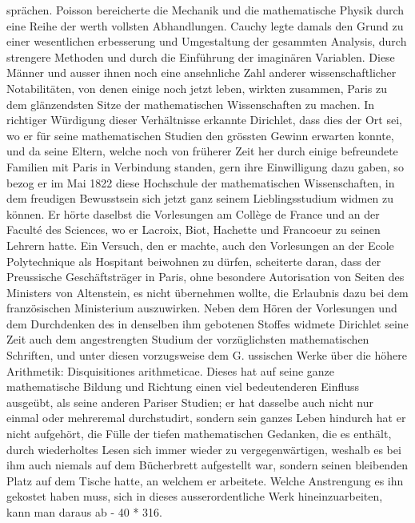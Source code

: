 \documentclass[11pt]{article}
\begin{document}
\noindent sprächen. Poisson bereicherte die Mechanik und die mathematische Physik durch eine Reihe der werth vollsten Abhandlungen. Cauchy legte damals den Grund zu einer wesentlichen   erbesserung und Umgestaltung der gesammten Analysis, durch strengere Methoden und durch die Einführung der imaginären Variablen. Diese Männer und ausser ihnen noch eine ansehnliche Zahl anderer wissenschaftlicher Notabilitäten, von denen einige noch jetzt leben, wirkten zusammen, Paris zu dem glänzendsten Sitze der mathematischen Wissenschaften zu machen. In richtiger Würdigung dieser Verhältnisse erkannte Dirichlet, dass dies der Ort sei, wo er für seine mathematischen Studien den grössten Gewinn erwarten konnte, und da seine Eltern, welche noch von früherer Zeit her durch einige befreundete Familien mit Paris in Verbindung standen, gern ihre Einwilligung dazu gaben, so bezog er im Mai 1822 diese Hochschule der mathematischen Wissenschaften, in dem freudigen Bewusstsein sich jetzt ganz seinem Lieblingsstudium widmen zu können. Er hörte daselbst die Vorlesungen am Collège de France und an der Faculté des Sciences, wo er Lacroix, Biot, Hachette und Francoeur zu seinen Lehrern hatte. Ein Versuch, den er machte, auch den Vorlesungen an der Ecole Polytechnique als Hospitant beiwohnen zu dürfen, scheiterte daran, dass der Preussische Geschäftsträger in Paris, ohne besondere Autorisation von Seiten des Ministers von Altenstein, es nicht übernehmen wollte, die Erlaubnis dazu bei dem französischen Ministerium auszuwirken. Neben dem Hören der Vorlesungen und dem Durchdenken des in denselben ihm gebotenen Stoffes widmete Dirichlet seine Zeit auch dem angestrengten Studium der vorzüglichsten mathematischen Schriften, und unter diesen vorzugsweise dem G.  ussischen Werke über die höhere Arithmetik: Disquisitiones arithmeticae. Dieses hat auf seine ganze mathematische Bildung und Richtung einen viel bedeutenderen Einfluss ausgeübt, als seine anderen Pariser Studien; er hat dasselbe auch nicht nur einmal oder mehreremal durchstudirt, sondern sein ganzes Leben hindurch hat er nicht aufgehört, die Fülle der tiefen mathematischen Gedanken, die es enthält, durch wiederholtes Lesen sich immer wieder zu vergegenwärtigen, weshalb es bei ihm auch niemals auf dem Bücherbrett aufgestellt war, sondern seinen bleibenden Platz auf dem Tische hatte, an welchem er arbeitete. Welche Anstrengung es ihn gekostet haben muss, sich in dieses ausserordentliche Werk hineinzuarbeiten, kann man daraus ab - 40 * 316. 
\par
\end{document}
